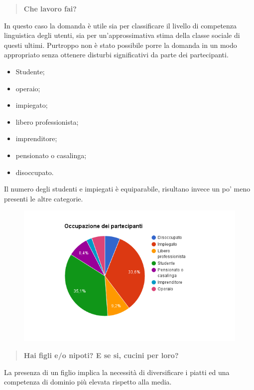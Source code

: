 \begin{quote}
	\textbf{Che lavoro fai?}
\end{quote}
In questo caso la domanda è utile sia per classificare il livello di competenza
linguistica degli utenti, sia per un'approssimativa stima della classe sociale
di questi ultimi.  Purtroppo non è stato possibile porre la domanda in un modo
appropriato senza ottenere disturbi significativi da parte dei partecipanti.

\begin{itemize}
	\item Studente;
	\item operaio;
	\item impiegato;
	\item libero professionista;
	\item imprenditore;
	\item pensionato o casalinga;
	\item disoccupato.
\end{itemize}

Il numero degli studenti e impiegati è equiparabile, risultano
invece un po' meno presenti le altre categorie.

\begin{figure}[H]
	\centering
	\includegraphics[scale=0.6]{img/chart_occupazione}
\end{figure}

\begin{quote}
	\textbf{Hai figli e/o nipoti? E se si, cucini per loro?}
\end{quote}

La presenza di un figlio implica la necessità di diversificare i piatti ed una
competenza di dominio più elevata rispetto alla media.\\

